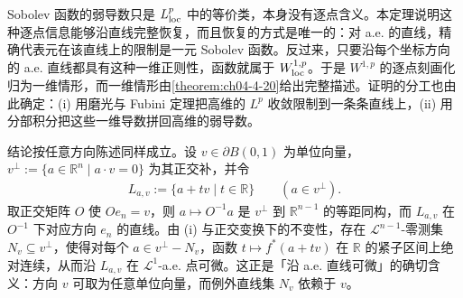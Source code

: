 ﻿\documentclass[../../main.tex]{subfiles}%
\begin{document}
\begin{remark}\label{remark:ch04-thm-4-21-动机}
Sobolev 函数的弱导数只是 $L^{p}_{\mathrm{loc}}$ 中的等价类，本身没有逐点含义。本定理说明这种逐点信息能够沿直线完整恢复，而且恢复的方式是唯一的：对 a.e. 的直线，精确代表元在该直线上的限制是一元 Sobolev 函数。反过来，只要沿每个坐标方向的 a.e. 直线都具有这种一维正则性，函数就属于 $W^{1,p}_{\mathrm{loc}}$。于是 $W^{1,p}$ 的逐点刻画化归为一维情形，而一维情形由\cref{theorem:ch04-4-20}给出完整描述。证明的分工也由此确定：(i) 用磨光与 Fubini 定理把高维的 $L^{p}$ 收敛限制到一条条直线上，(ii) 用分部积分把这些一维导数拼回高维的弱导数。 %

结论按任意方向陈述同样成立。设 $v\in\partial B(0,1)$ 为单位向量，$v^{\perp}:=\{a\in\mathbb{R}^{n}\mid a\cdot v=0\}$ 为其正交补，并令
\begin{align*}
L_{a,v}:=\{a+tv\mid t\in\mathbb{R}\}\qquad(a\in v^{\perp}).
\end{align*}
取正交矩阵 $O$ 使 $Oe_{n}=v$，则 $a\mapsto O^{-1}a$ 是 $v^{\perp}$ 到 $\mathbb{R}^{n-1}$ 的等距同构，而 $L_{a,v}$ 在 $O^{-1}$ 下对应方向 $e_{n}$ 的直线。由 (i) 与正交变换下的不变性，存在 $\mathcal{L}^{n-1}$-零测集 $N_{v}\subseteq v^{\perp}$，使得对每个 $a\in v^{\perp}-N_{v}$，函数 $t\mapsto f^{*}(a+tv)$ 在 $\mathbb{R}$ 的紧子区间上绝对连续，从而沿 $L_{a,v}$ 在 $\mathcal{L}^{1}$-a.e. 点可微。这正是「沿 a.e. 直线可微」的确切含义：方向 $v$ 可取为任意单位向量，而例外直线集 $N_{v}$ 依赖于 $v$。
\end{remark}
\end{document}
